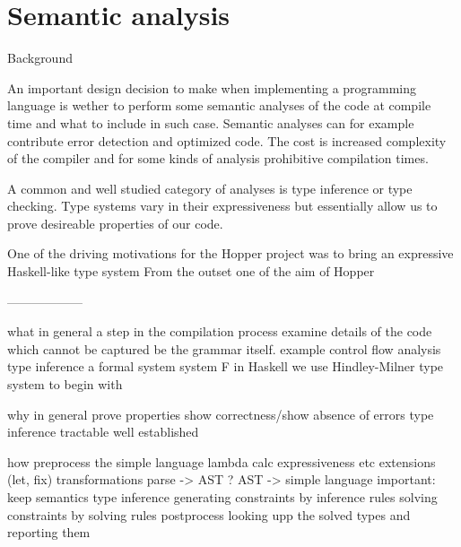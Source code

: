 \section{Semantic analysis}

Background

An important design decision to make when implementing a programming language is wether to perform some semantic analyses of the code at compile time and what to include in such case. Semantic analyses can for example contribute error detection and optimized code. The cost is increased complexity of the compiler and for some kinds of analysis prohibitive compilation times.

A common and well studied category of analyses is type inference or type checking. Type systems vary in their expressiveness but essentially allow us to prove desireable properties of our code.

One of the driving motivations for the Hopper project was to bring an expressive Haskell-like type system From the outset one of the  aim of Hopper

------------------

what
  in general
    a step in the compilation process
    examine details of the code which cannot be captured be the grammar itself.
    example control flow analysis
  type inference
    a formal system
    system F in Haskell
    we use Hindley-Milner type system to begin with

why
  in general
    prove properties
    show correctness/show absence of errors
  type inference
    tractable
    well established

how
  preprocess
    the simple language
      lambda calc
        expressiveness etc
        extensions (let, fix)
    transformations
      parse -> AST ?
      AST -> simple language
      important: keep semantics
  type inference
    generating constraints by inference rules
    solving constraints by solving rules
  postprocess
    looking upp the solved types and reporting them
